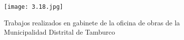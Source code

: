 \begin{figure}[h]
	\captionsetup{width=0.8\textwidth}
	\centering
	\texttt{[image: 3.18.jpg]}
	\caption[Trabajos realizados en gabinete]{Trabajos realizados en gabinete de la oficina de obras de la Municipalidad Distrital de Tamburco}
	\label{fig:img20230825125748803}
\end{figure}